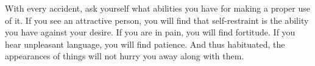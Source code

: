 With every accident,  ask yourself what abilities you have  for making a proper
use of it. If  you see an attractive person, you  will find that self-restraint
is the ability you have against your desire.  If you are in pain, you will find
fortitude. If  you hear unpleasant language,  you will find patience.  And thus
habituated, the appearances of things will not hurry you away along with them.
